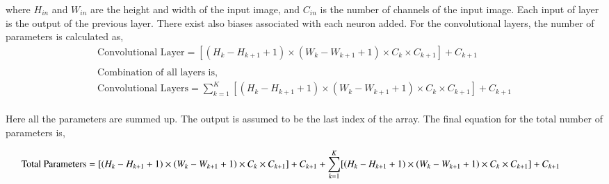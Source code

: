 \documentclass[3p,times,procedia]{elsarticle}
\begin{document}
\begin{enumerate}
    \vspace{-0.25cm}
    where $H_{in}$ and $W_{in}$ are the height and width of the input image, and $C_{in}$ is the number of channels of the input image.
    Each input of layer is the output of the previous layer.
    There exist also biases associated with each neuron added.
    For the convolutional layers, the number of parameters is calculated as,
    \vspace{-0.5cm}
    \begin{equation*}
        \begin{array}{c}
            \displaystyle \textrm{Convolutional Layer} = [(H_k-H_{k+1}+1) \times (W_k-W_{k+1}+1) \times C_{k} \times C_{k+1}] + C_{k+1} \\
            \\
            \displaystyle \textrm{Combination of all layers is,} \\
            \displaystyle \textrm{Convolutional Layers} = \sum_{k=1}^{K} [(H_k-H_{k+1}+1) \times (W_k-W_{k+1}+1) \times C_{k} \times C_{k+1}] + C_{k+1} \\ 
        \end{array}
    \end{equation*}

    \vspace{-0.25cm}
    Here all the parameters are summed up. The output is assumed to be the last index of the array.
    The final equation for the total number of parameters is,
    \vspace{-0.5cm}

    
    \begin{equation*}
        \hspace{-1cm} \textrm{Total Parameters} = [(H_k-H_{k+1}+1) \times (W_k-W_{k+1}+1) \times C_{k} \times C_{k+1}] + C_{k+1} + \sum_{k=1}^{K} [(H_k-H_{k+1}+1) \times (W_k-W_{k+1}+1) \times C_{k} \times C_{k+1}] + C_{k+1}
    \end{equation*}

    \vspace{-0.25cm}

\end{enumerate}

\end{document}
